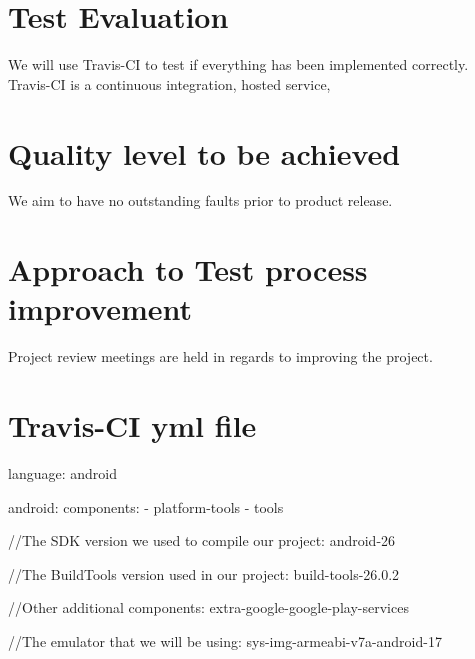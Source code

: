 \documentclass[english]{article}
\begin{document}
	\section{Test Evaluation}
	
	We will use Travis-CI to test if everything has been implemented correctly.
	Travis-CI is a continuous integration, hosted service,  
	\section{Quality level to be achieved}
	We aim to have no outstanding faults prior to product release.
	
	\section{Approach to Test process improvement}
	Project review meetings are held in regards to improving the project. 
	
	\section{Travis-CI yml file}
	language: android
	
	android:
	components:
	- platform-tools
	- tools
	
	
	//The SDK version we used to compile our project:
	 android-26
	
	//The BuildTools version used in our project: 
	 build-tools-26.0.2
	
	//Other additional components:  extra-google-google-play-services
	
	//The emulator that we will be using:
	 sys-img-armeabi-v7a-android-17	
		
\end{document}
